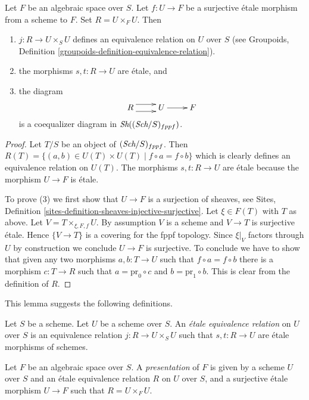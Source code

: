 \begin{lemma}
\label{lemma-space-presentation}
Let $F$ be an algebraic space over $S$. Let $f : U \to F$ be a
surjective \'etale morphism from a scheme to $F$. Set $R = U \times_F U$.
Then
\begin{enumerate}
\item $j : R \to U \times_S U$ defines an equivalence relation on
$U$ over $S$ (see
Groupoids, Definition \ref{groupoids-definition-equivalence-relation}).
\item the morphisms $s, t : R \to U$ are \'etale, and
\item the diagram
$$
\xymatrix{
R \ar@<1ex>[r] \ar@<-1ex>[r] &
U \ar[r] &
F
}
$$
is a coequalizer diagram in $\mathop{\textit{Sh}}\nolimits((\textit{Sch}/S)_{fppf})$.
\end{enumerate}
\end{lemma}

\begin{proof}
Let $T/S$ be an object of $(\textit{Sch}/S)_{fppf}$.
Then $R(T) = \{(a, b) \in U(T) \times U(T) \mid f \circ a = f \circ b\}$
which is clearly defines an equivalence relation on $U(T)$.
The morphisms $s, t : R \to U$ are \'etale because the morphism
$U \to F$ is \'etale.

\medskip\noindent
To prove (3) we first show that
$U \to F$ is a surjection of sheaves, see
Sites, Definition \ref{sites-definition-sheaves-injective-surjective}.
Let $\xi \in F(T)$ with $T$ as above. Let $V = T \times_{\xi, F, f}U$.
By assumption $V$ is a scheme and $V \to T$ is surjective \'etale.
Hence $\{V \to T\}$ is a covering for the fppf topology.
Since $\xi|_V$ factors through $U$ by construction we
conclude $U \to F$ is surjective. To conclude we
have to show that given any two morphisms
$a, b : T \to U$ such that $f \circ a = f \circ b$ there is a
morphism $c : T \to R$ such that $a = \text{pr}_0 \circ c$
and $b = \text{pr}_1 \circ b$. This is clear from the definition
of $R$.
\end{proof}

\noindent
This lemma suggests the following definitions.

\begin{definition}
\label{definition-etale-equivalence-relation}
Let $S$ be a scheme. Let $U$ be a scheme over $S$.
An {\it \'etale equivalence relation} on $U$ over $S$
is an equivalence relation $j : R \to U \times_S U$
such that $s, t : R \to U$ are \'etale morphisms of schemes.
\end{definition}

\begin{definition}
\label{definition-presentation}
Let $F$ be an algebraic space over $S$.
A {\it presentation} of $F$ is given by a scheme
$U$ over $S$ and an \'etale equivalence relation $R$ on $U$ over $S$, and
a surjective \'etale morphism $U \to F$ such that $R = U \times_F U$.
\end{definition}

